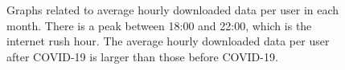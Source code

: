\begin{figure}[t]
  \hspace{0.2cm}
        
  \caption{Graphs related to average hourly downloaded data per user in each month. There is a peak between 18:00 and 22:00, which is the internet rush hour. The average hourly downloaded data per user after COVID-19 is larger than those before COVID-19.}
  \label{fig:download-data-per-user-hours-fig} 
\end{figure}

